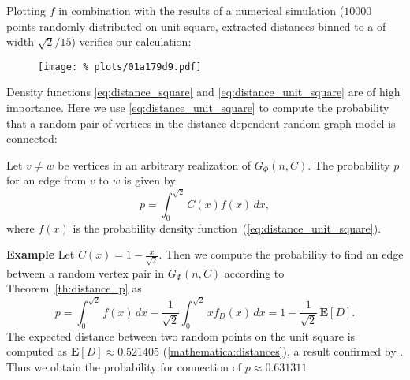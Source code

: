 Plotting $f$ in combination with the results of a numerical simulation
($10000$ points randomly distributed on unit square, extracted
distances binned to a of width $\sqrt{2}/15$) verifies our calculation: 
%
\begin{figure}[H]
  \centering
  \texttt{[image: \%
    plots/01a179d9.pdf]}%
  \label{fig:distance_distribution}
\end{figure}
%
\vspace{-0.8cm} Density functions \ref{eq:distance_square} and
\ref{eq:distance_unit_square} are of high importance. %
Here we use \ref{eq:distance_unit_square} to compute the probability
that a random pair of vertices in the distance-dependent random graph
model is connected:

\begin{corollary}\label{th:distance_p} Let $v \neq w$ be vertices in an arbitrary
  realization of $G_{\Phi}(n,C)$. The probability $p$ for an edge
  from $v$ to $w$ is given by 
  \[
    p = \int_0^{\sqrt{2}} C(x) f(x) \, dx,
  \]
  where $f(x)$ is the probability density function~(\ref{eq:distance_unit_square}).
\end{corollary}

\textbf{Example} Let $C(x) = 1 - \frac{x}{\sqrt{2}}$. Then we compute
the probability to find an edge between a random vertex pair in
$G_{\Phi}(n,C)$ according to Theorem~\ref{th:distance_p} as
\[
  p = \int_{0}^{\sqrt{2}} f(x) \, dx - \frac{1}{\sqrt{2}}
  \int_0^{\sqrt{2}} x f_D(x) \, dx = 1 - \frac{1}{\sqrt{2}}\, \mathbf{E}[D].
\]
The expected distance between two random points on the unit square is
computed as $\mathbf{E}[D] \approx 0.521405$ (\autoref{mathematica:distances}),
a result confirmed by \textcite{Philip2007}. Thus we obtain the
probability for connection of $p \approx 0.631311$






